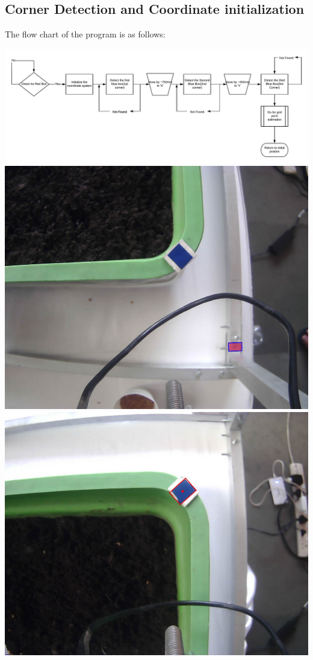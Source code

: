 \documentclass[a4paper,12pt,oneside]{book}
\begin{document}
\subsection*{Corner Detection and Coordinate initialization}
\begin{center}
    \item The flow chart of the program is as follows:
    \begin{center}
        \includegraphics[scale=0.5]{Grid_coord_ini.png}
        \includegraphics[scale=0.3]{img00.jpg}
        \includegraphics[scale=0.3]{img02.jpg}
    \end{center}
\end{center}
\end{document}
